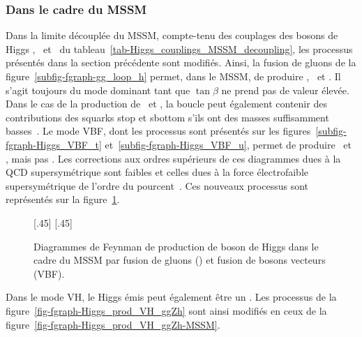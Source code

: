 \subsubsection{Dans le cadre du MSSM}\label{chapter-MS-MSSM-section-pheno_Higgs_MSSM-subsec-production-MSSM}
Dans la limite découplée du MSSM, compte-tenu des couplages des bosons de Higgs \higgs, \Higgs\ et \HiggsA\ du tableau~\ref{tab-Higgs_couplings_MSSM_decoupling}, les processus présentés dans la section précédente sont modifiés.
Ainsi, la fusion de gluons de la figure~\ref{subfig-fgraph-gg_loop_h} permet, dans le MSSM, de produire \higgs, \Higgs\ et \HiggsA.
Il s'agit toujours du mode dominant tant que $\tan\beta$ ne prend pas de valeur élevée.
Dans le cas de la production de \higgs\ et \Higgs, la boucle peut également contenir des contributions des squarks stop et sbottom s'ils ont des masses suffisamment basses~\cite{Dawson_1996}.
Le mode VBF, dont les processus sont présentés sur les figures~\ref{subfig-fgraph-Higgs_VBF_t} et~\ref{subfig-fgraph-Higgs_VBF_u}, permet de produire \higgs\ et \Higgs, mais pas \HiggsA.
Les corrections aux ordres supérieurs de ces diagrammes dues à la QCD supersymétrique sont faibles et celles dues à la force électrofaible supersymétrique de l'ordre du pourcent~\cite{Higgs_xsec_book_1}.
Ces nouveaux processus sont représentés sur la figure~\ref{fig-fgraph-Higgs_prod_ggh_VBF-MSSM}.
\begin{figure}[h]
\centering
\vspace{\baselineskip}
[.45\textwidth]
{\vspace{\baselineskip}}
\hfill
{}[.45\textwidth]
{\vspace{\baselineskip}}
\caption[Production de boson de Higgs du MSSM par fusion de gluons et de bosons vecteurs.]{Diagrammes de Feynman de production de boson de Higgs dans le cadre du MSSM par fusion de gluons (\gluon\gluon\Higgs) et fusion de bosons vecteurs (VBF).}
\label{fig-fgraph-Higgs_prod_ggh_VBF-MSSM}
\end{figure}
\par Dans le mode VH, le Higgs émis peut également être un \Higgs.
Les processus de la figure~\ref{fig-fgraph-Higgs_prod_VH_ggZh} sont ainsi modifiés en ceux de la figure~\ref{fig-fgraph-Higgs_prod_VH_ggZh-MSSM}.
